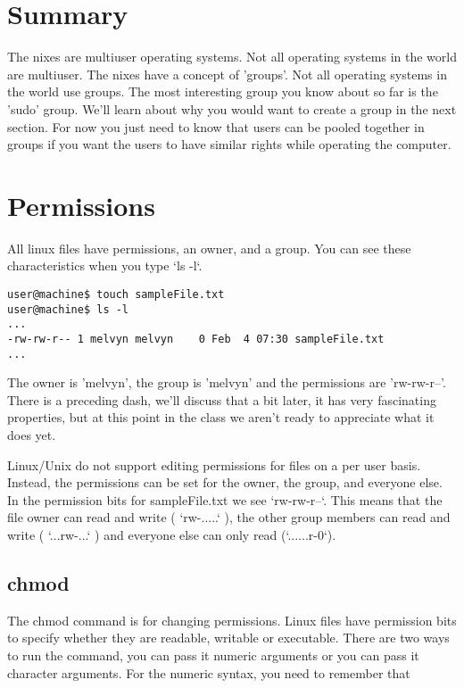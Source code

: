 \documentclass[10pt]{article}
\begin{document}
\section{Summary }
The \*nixes are multiuser operating systems. Not all operating systems in the world are multiuser. The \*nixes have a concept of 'groups'. Not all operating systems in the world use groups. The most interesting group you know about so far is the 'sudo' group. We'll learn about why you would want to create a group in the next section. For now you just need to know that users can be pooled together in groups if you want the users to have similar rights while operating the computer. 

\section{ Permissions }

All linux files have permissions, an owner, and a group. You can see these characteristics when you type `ls -l`.

\begin{lstlisting}[style=term]
user@machine$ touch sampleFile.txt
user@machine$ ls -l
...
-rw-rw-r-- 1 melvyn melvyn    0 Feb  4 07:30 sampleFile.txt
...
\end{lstlisting}

The owner is 'melvyn', the group is 'melvyn' and the permissions are 'rw-rw-r--'. There is a preceding dash, we'll 
discuss that a bit later, it has very fascinating properties, but at this point in the class we aren't ready to appreciate what it does yet.

Linux/Unix do not support editing permissions for files on a per user basis. Instead, the permissions can 
be set for the owner, the group, and everyone else. In the permission bits for sampleFile.txt we see `rw-rw-r--`.
This means that the file owner can read and write ( `rw-.....` ), the other group members can read and write ( `...rw-...` ) and everyone else
can only read (`......r-0`).

\subsection{ chmod }
The chmod command is for changing permissions. Linux files have permission bits to specify whether they are readable, writable or executable.
There are two ways to run the command, you can pass it numeric arguments or you can pass it character arguments. For the numeric syntax, you need to remember that 
\end{document}
